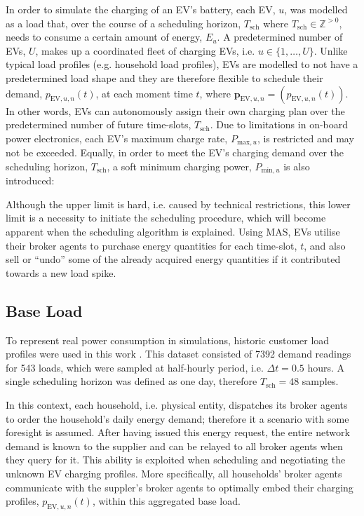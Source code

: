In order to simulate the charging of an EV's battery, each EV, $u$, was modelled as a load that, over the course of a scheduling horizon, $T_\text{sch}$ where $T_\text{sch} \in \mathbb{Z}^{>0}$, needs to consume a certain amount of energy, $E_u$.
A predetermined number of EVs, $U$, makes up a coordinated fleet of charging EVs, i.e. $u \in \{1, \dots, U\}$.
Unlike typical load profiles (e.g. household load profiles), EVs are modelled to not have a predetermined load shape and they are therefore flexible to schedule their demand, $p_{\text{EV},u,n}(t)$, at each moment time $t$, where $\textbf{p}_{\text{EV},u,n} = (p_{\text{EV},u,n}(t))$.
In other words, EVs can autonomously assign their own charging plan over the predetermined number of future time-slots, $T_\text{sch}$.
Due to limitations in on-board power electronics, each EV's maximum charge rate, $P_{\text{max},u}$, is restricted and may not be exceeded.
Equally, in order to meet the EV's charging demand over the scheduling horizon, $T_\text{sch}$, a soft minimum charging power, $P_{\text{min},u}$ is also introduced:



Although the upper limit is hard, i.e. caused by technical restrictions, this lower limit is a necessity to initiate the scheduling procedure, which will become apparent when the scheduling algorithm is explained.
Using MAS, EVs utilise their broker agents to purchase energy quantities for each time-slot, $t$, and also sell or ``undo'' some of the already acquired energy quantities if it contributed towards a new load spike.

\subsection{Base Load}


To represent real power consumption in simulations, historic customer load profiles were used in this work \cite{IrishData2002}.
This dataset consisted of 7392 demand readings for 543 loads, which were sampled at half-hourly period, i.e. $\Delta t = 0.5$ hours.
A single scheduling horizon was defined as one day, therefore $T_\text{sch}=48$ samples.

In this context, each household, i.e. physical entity, dispatches its broker agents to order the household's daily energy demand; therefore it a scenario with some foresight is assumed.
After having issued this energy request, the entire network demand is known to the supplier and can be relayed to all broker agents when they query for it.
This ability is exploited when scheduling and negotiating the unknown EV charging profiles.
More specifically, all households' broker agents communicate with the suppler's broker agents to optimally embed their charging profiles, $p_{\text{EV},u,n}(t)$, within this aggregated base load.

